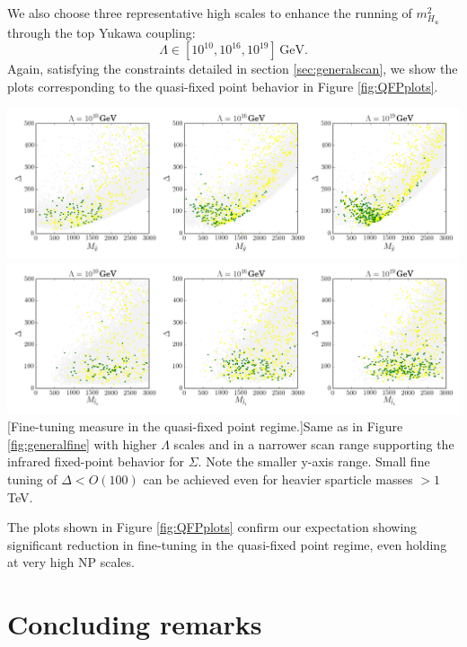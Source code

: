 We also choose three representative high scales to enhance the running of $m^2_{H_u}$ through the top Yukawa coupling:
\begin{equation}
\Lambda \in \left[10^{10},10^{16},10^{19} \right]\,\text{GeV}.
\end{equation}
Again, satisfying the constraints detailed in section \ref{sec:generalscan}, we show the plots corresponding to the quasi-fixed point behavior in Figure \ref{fig:QFPplots}.
\begin{center}
	\includegraphics[scale=0.4]{figures/plot_mglu_QFP.png}
	\includegraphics[scale=0.4]{figures/plot_mt1_QFP.png}
[Fine-tuning measure in the quasi-fixed point regime.]{Same as in Figure \ref{fig:generalfine} with higher $\Lambda$ scales and in a narrower scan range supporting the infrared fixed-point behavior for $\Sigma$. Note the smaller y-axis range. Small fine tuning of $\Delta < O(100)$ can be achieved even for heavier sparticle masses $> 1$ TeV.}
\label{fig:QFPplots}
\end{center}
The plots shown in Figure \ref{fig:QFPplots} confirm our expectation showing significant reduction in fine-tuning in the quasi-fixed point regime, even holding at very high NP scales.

\section{Concluding remarks}

